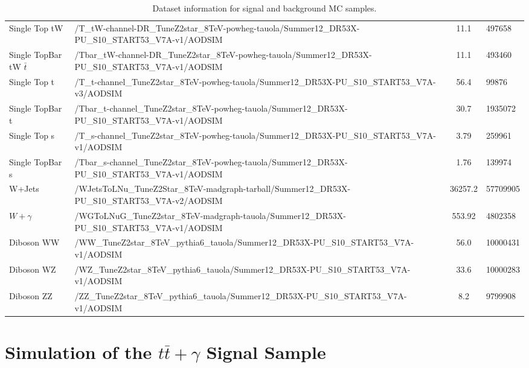 \begin{table}
\begin{center}
{\begin{tabular}{|l| p{12.5cm} |c|p{2cm}|}
\hline	
	Single Top tW & /T\_tW-channel-DR\_TuneZ2star\_8TeV-powheg-tauola/Summer12\_DR53X-PU\_S10\_START53\_V7A-v1/AODSIM & 11.1 & 497658 \\
	Single TopBar tW $\bar{t}$ & /Tbar\_tW-channel-DR\_TuneZ2star\_8TeV-powheg-tauola/Summer12\_DR53X-PU\_S10\_START53\_V7A-v1/AODSIM & 11.1 & 493460 \\
	Single Top t & /T\_t-channel\_TuneZ2star\_8TeV-powheg-tauola/Summer12\_DR53X-PU\_S10\_START53\_V7A-v3/AODSIM & 56.4 & 99876 \\
	Single TopBar t & /Tbar\_t-channel\_TuneZ2star\_8TeV-powheg-tauola/Summer12\_DR53X-PU\_S10\_START53\_V7A-v1/AODSIM & 30.7 & 1935072 \\
	Single Top s & /T\_s-channel\_TuneZ2star\_8TeV-powheg-tauola/Summer12\_DR53X-PU\_S10\_START53\_V7A-v1/AODSIM & 3.79 & 259961 \\
	Single TopBar s & /Tbar\_s-channel\_TuneZ2star\_8TeV-powheg-tauola/Summer12\_DR53X-PU\_S10\_START53\_V7A-v1/AODSIM  & 1.76 & 139974 \\
\hline	
	W+Jets & /WJetsToLNu\_TuneZ2Star\_8TeV-madgraph-tarball/Summer12\_DR53X-PU\_S10\_START53\_V7A-v2/AODSIM & 36257.2 & 57709905 \\
\hline	
	$W+\gamma$ & /WGToLNuG\_TuneZ2star\_8TeV-madgraph-tauola/Summer12\_DR53X-PU\_S10\_START53\_V7A-v1/AODSIM & 553.92 & 4802358 \\
\hline	
	Diboson WW & /WW\_TuneZ2star\_8TeV\_pythia6\_tauola/Summer12\_DR53X-PU\_S10\_START53\_V7A-v1/AODSIM & 56.0 & 10000431\\
	Diboson WZ & /WZ\_TuneZ2star\_8TeV\_pythia6\_tauola/Summer12\_DR53X-PU\_S10\_START53\_V7A-v1/AODSIM & 33.6 & 10000283\\
	Diboson ZZ & /ZZ\_TuneZ2star\_8TeV\_pythia6\_tauola/Summer12\_DR53X-PU\_S10\_START53\_V7A-v1/AODSIM & 8.2 & 9799908\\
\hline	
\end{tabular}
}
\end{center}
\caption{Dataset information for signal and background MC samples.}
\label{tab-MCSamples}
\end{table}


\section{Simulation of the $t\bar{t}+\gamma$ Signal Sample} \label{sec-mcsim}

